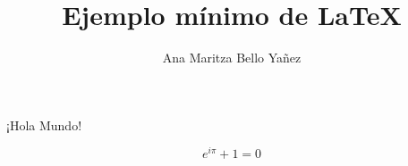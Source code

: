 \documentclass{article}
\begin{document}
\title{Ejemplo mínimo de \LaTeX}
\author{Ana Maritza Bello Yañez}
\maketitle


¡Hola Mundo!

$$ e^{i\pi} + 1 = 0 $$
\end{document}
